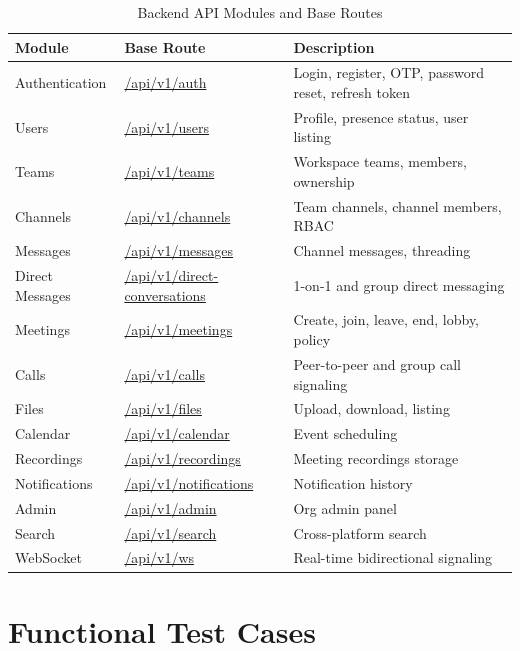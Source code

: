 \documentclass[11pt,a4paper]{report}
\begin{document}
\begin{xltabular}{\textwidth}{|L{3cm}|L{5.5cm}|X|}
\caption{Backend API Modules and Base Routes} \\
\hline
{} \textbf{Module} & \textbf{Base Route} & \textbf{Description} \\ \hline
\endhead
Authentication  & \url{/api/v1/auth}           & Login, register, OTP, password reset, refresh token \\ \hline
Users           & \url{/api/v1/users}          & Profile, presence status, user listing \\ \hline
Teams           & \url{/api/v1/teams}          & Workspace teams, members, ownership \\ \hline
Channels        & \url{/api/v1/channels}       & Team channels, channel members, RBAC \\ \hline
Messages        & \url{/api/v1/messages}       & Channel messages, threading \\ \hline
Direct Messages & \url{/api/v1/direct-conversations} & 1-on-1 and group direct messaging \\ \hline
Meetings        & \url{/api/v1/meetings}       & Create, join, leave, end, lobby, policy \\ \hline
Calls           & \url{/api/v1/calls}          & Peer-to-peer and group call signaling \\ \hline
Files           & \url{/api/v1/files}          & Upload, download, listing \\ \hline
Calendar        & \url{/api/v1/calendar}       & Event scheduling \\ \hline
Recordings      & \url{/api/v1/recordings}     & Meeting recordings storage \\ \hline
Notifications   & \url{/api/v1/notifications}  & Notification history \\ \hline
Admin           & \url{/api/v1/admin}          & Org admin panel \\ \hline
Search          & \url{/api/v1/search}         & Cross-platform search \\ \hline
WebSocket       & \url{/api/v1/ws}             & Real-time bidirectional signaling \\ \hline
\end{xltabular}

\chapter{Functional Test Cases}
\end{document}
